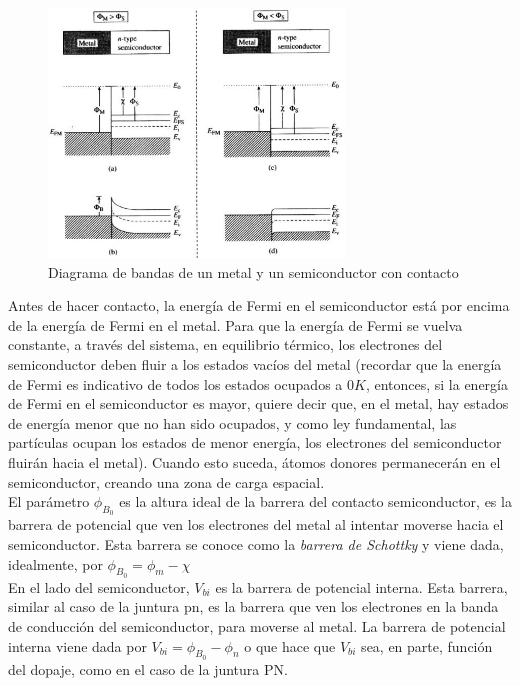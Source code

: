 \documentclass[oneside]{book}
\numberwithin{equation}{section}
\numberwithin{figure}{section}
\numberwithin{table}{section}
\begin{document}
			\begin{figure}[H]
				\begin{center}
					\includegraphics[width=0.7\textwidth]{metalsemiconductorencontacto.png}
					\caption{Diagrama de bandas de un metal y un semiconductor con contacto}
					\label{Diagrama de bandas de un metal y un semiconductor con contacto}
				\end{center}
			\end{figure}

			Antes de hacer contacto, la energía de Fermi en el semiconductor está por encima de la energía de Fermi en el metal. Para que la energía de Fermi se vuelva constante, a través del sistema, en equilibrio térmico, los electrones del semiconductor deben fluir a los estados vacíos del metal (recordar que la energía de Fermi es indicativo de todos los estados ocupados a $0K$, entonces, si la energía de Fermi en el semiconductor es mayor, quiere decir que, en el metal, hay estados de energía menor que no han sido ocupados, y como ley fundamental, las partículas ocupan los estados de menor energía, los electrones del semiconductor fluirán hacia el metal). Cuando esto suceda, átomos donores permanecerán en el semiconductor, creando una zona de carga espacial.\\

			El parámetro $\phi_{B_0}$ es la altura ideal de la barrera del contacto semiconductor, es la barrera de potencial que ven los electrones del metal al intentar moverse hacia el semiconductor. Esta barrera se conoce como la \emph{barrera de Schottky} y viene dada, idealmente, por $\phi_{B_0}=\phi_{m}-\chi$\\

			En el lado del semiconductor, $V_{bi}$ es la barrera de potencial interna. Esta barrera, similar al caso de la juntura pn, es la barrera que ven los electrones en la banda de conducción del semiconductor, para moverse al metal. La barrera de potencial interna viene dada por $V_{bi}=\phi_{B_0}-\phi_n$ o que hace que $V_{bi}$ sea, en parte, función del dopaje, como en el caso de la juntura PN.\\
\end{document}
